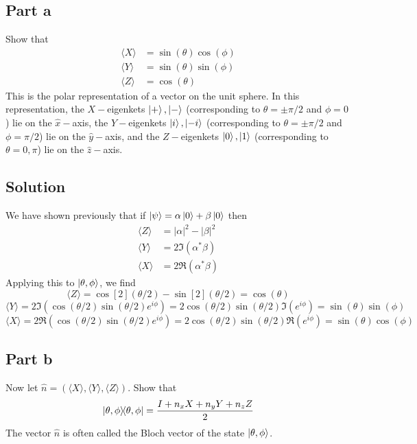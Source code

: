 \documentclass{article}
\begin{document}
{\subsection*{Part a}
Show that
\begin{align*}
\langle X \rangle &= \sin(\theta)\cos(\phi) \\
\langle Y \rangle &= \sin(\theta)\sin(\phi) \\
\langle Z \rangle &= \cos(\theta)
\end{align*}
This is the polar representation of a vector on the unit sphere. In this representation, the $X-$eigenkets $\ket{+}, \ket{-}$ (corresponding to $\theta = \pm\pi/2$ and $\phi = 0$) lie on the $\hat x-$axis, the $Y-$eigenkets $\ket{i},\ket{-i}$ (corresponding to $\theta = \pm\pi/2$ and $\phi = \pi/2$) lie on the $\hat y-$axis, and the $Z-$eigenkets $\ket{0},\ket{1}$ (corresponding to $\theta = 0, \pi$) lie on the $\hat z-$axis.

\subsection*{Solution}
We have shown previously that if $\ket{\psi} = \alpha \ket{0} + \beta \ket{0}$ then
\begin{align*}
    \langle Z \rangle &= |\alpha|^2 - |\beta|^2 \\
    \langle Y \rangle &= 2\Im(\alpha^\ast \beta) \\
    \langle X \rangle &= 2\Re(\alpha^\ast \beta)
\end{align*}
Applying this to $\ket{\theta, \phi}$, we find
$$
\langle Z \rangle = \cos[2](\theta/2) - \sin[2](\theta/2) = \cos(\theta)
$$
$$
\langle Y \rangle = 2\Im(\cos(\theta/2)\sin(\theta/2)e^{i\phi}) = 2\cos(\theta/2)\sin(\theta/2)\Im(e^{i\phi}) = \sin(\theta)\sin(\phi)
$$
$$
\langle X \rangle = 2\Re(\cos(\theta/2)\sin(\theta/2)e^{i\phi}) = 2\cos(\theta/2)\sin(\theta/2)\Re(e^{i\phi}) = \sin(\theta)\cos(\phi)
$$
\subsection*{Part b}
\par Now let $\hat n = (\langle X \rangle, \langle Y \rangle, \langle Z \rangle)$. 
Show that
$$
\ketbra{\theta, \phi}{\theta, \phi} = \frac{I + n_xX + n_yY + n_zZ}{2}
$$
The vector $\hat n$ is often called the Bloch vector of the state $\ket{\theta, \phi}$.

}
\end{document}

